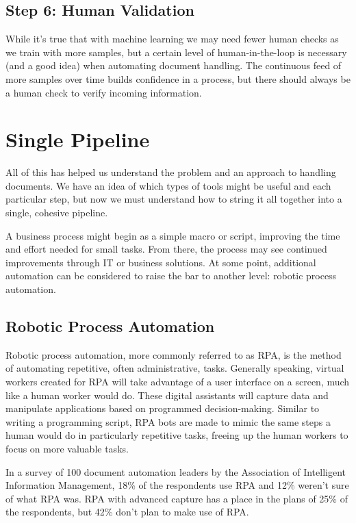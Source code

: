 \documentclass[conference]{IEEEtran}
\begin{document}
\subsection{Step 6: Human Validation}
While it's true that with machine learning we may need fewer human checks as we train with more samples, but a certain level of human-in-the-loop is necessary (and a good idea) when automating document handling. The continuous feed of more samples over time builds confidence in a process, but there should always be a human check to verify incoming information.

\section{Single Pipeline}
All of this has helped us understand the problem and an approach to handling documents. We have an idea of which types of tools might be useful and each particular step, but now we must understand how to string it all together into a single, cohesive pipeline.

A business process might begin as a simple macro or script, improving the time and effort needed for small tasks. From there, the process may see continued improvements through IT or business solutions. At some point, additional automation can be considered to raise the bar to another level: robotic process automation.

\subsection{Robotic Process Automation}
Robotic process automation, more commonly referred to as RPA, is the method of automating repetitive, often administrative, tasks. Generally speaking, virtual workers created for RPA will take advantage of a user interface on a screen, much like a human worker would do. These digital assistants will capture data and manipulate applications based on programmed decision-making. Similar to writing a programming script, RPA bots are made to mimic the same steps a human would do in particularly repetitive tasks, freeing up the human workers to focus on more valuable tasks.

In a survey of 100 document automation leaders by the Association of Intelligent Information Management, 18\% of the respondents use RPA and 12\% weren't sure of what RPA was. RPA with advanced capture has a place in the plans of 25\% of the respondents, but 42\% don't plan to make use of RPA. \cite{hollander2019survey}
\end{document}
